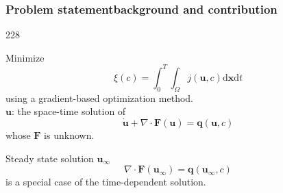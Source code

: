 \documentclass{beamer}
\newcommand{\barrow}{\item[\color{darkred}\ding{228}]}
\begin{document}
\begin{frame}
    \frametitle{Problem statement\hfill \scriptsize{background and contribution}}\small
    \begin{dinglist}{228}
        \barrow 
        Minimize 
        $$
           \xi(c) = \int_0^T \int_\Omega j(\boldsymbol{u},c) \textrm{d}\mathbf{x}\textrm{d}t
        $$
        using a gradient-based optimization method.\\

        $\boldsymbol{u}$: the space-time solution of
        \begin{equation*}
            \dot{\boldsymbol{u}} + \nabla \cdot {\boldsymbol{F}}
            (\boldsymbol{u})
            = \boldsymbol{q}(\boldsymbol{u},c)
        \end{equation*}
        whose $\boldsymbol{F}$ is unknown.
        \barrow 
        Steady state solution $\boldsymbol{u}_\infty$
        \begin{equation*} 
            \nabla \cdot {\boldsymbol{F}}
            (\boldsymbol{u}_\infty)
            = \boldsymbol{q}(\boldsymbol{u}_\infty,c)
        \end{equation*}
        is a special case of the time-dependent solution.
    \end{dinglist}
\end{frame}
\end{document}
